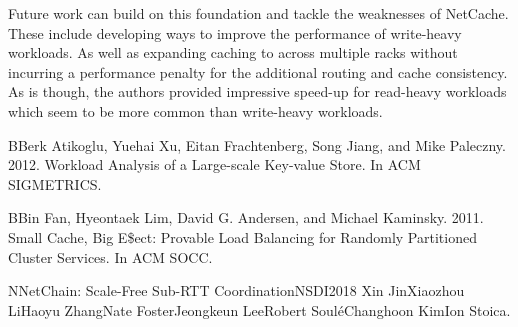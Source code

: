 \documentclass[11pt,twoside,twocolumn]{article}
\begin{document}
Future work can build on this foundation and tackle the weaknesses of NetCache. These include developing ways to improve the performance of write-heavy workloads. As well as expanding caching to across multiple racks without incurring a performance penalty for the additional routing and cache consistency. As is though, the authors provided impressive speed-up for read-heavy workloads which seem to be more common than write-heavy workloads.


\begin{thebibliography}{99} %

\bibitem[1]
BBerk Atikoglu, Yuehai Xu, Eitan Frachtenberg, Song Jiang, and Mike
Paleczny. 2012. Workload Analysis of a Large-scale Key-value Store.
In ACM SIGMETRICS.

\bibitem[2]
BBin Fan, Hyeontaek Lim, David G. Andersen, and Michael Kaminsky.
2011. Small Cache, Big E\$ect: Provable Load Balancing for Randomly
Partitioned Cluster Services. In ACM SOCC.

\bibitem[3]
NNetChain: Scale-Free Sub-RTT CoordinationNSDI2018
Xin JinXiaozhou LiHaoyu ZhangNate FosterJeongkeun LeeRobert SouléChanghoon KimIon Stoica.
 
\end{thebibliography}

\end{document}
